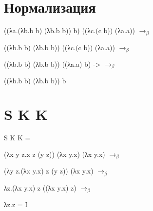 \documentclass{article}
\begin{document}
\section{Нормализация}
((λa.(λb.b b) (λb.b b)) b) ((λc.(c b)) (λa.a)) $\rightarrow_\beta$

((λb.b b) (λb.b b)) ((λc.(c b)) (λa.a)) $\rightarrow_\beta$

((λb.b b) (λb.b b)) ((λa.a) b) -> $\rightarrow_\beta$

((λb.b b) (λb.b b)) b

\section{S K K}
S K K =

(λx y z.x z (y z)) (λx y.x) (λx y.x) $\rightarrow_\beta$

(λy z.(λx y.x) z (y z)) (λx y.x) $\rightarrow_\beta$

λz.(λx y.x) z ((λx y.x) z) $\rightarrow_\beta$

λz.z = I
\end{document}
